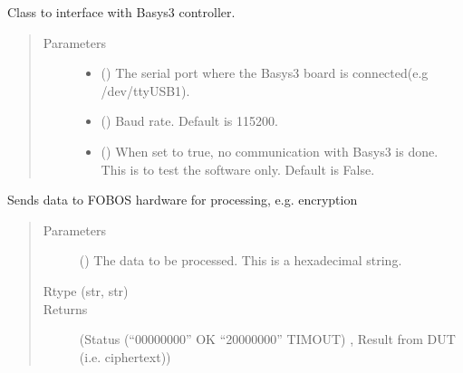 \documentclass[letterpaper,10pt,english]{sphinxmanual}
\begin{document}
\begin{fulllineitems}
\label{\detokenize{reference_doc:fobos.Basys3Ctrl}}
Class to interface with Basys3 controller.
\begin{quote}\begin{description}
\item[{Parameters}] \leavevmode\begin{itemize}
\item {} 
 () \textendash{} The serial port where the Basys3 board is connected(e.g /dev/ttyUSB1).

\item {} 
 () \textendash{} Baud rate. Default is 115200.

\item {} 
 () \textendash{} When set to true, no communication with Basys3 is done.
This is to test the software only. Default is False.

\end{itemize}

\end{description}\end{quote}

\begin{fulllineitems}
\label{\detokenize{reference_doc:fobos.Basys3Ctrl.processData}}
Sends data to FOBOS hardware for processing, e.g. encryption
\begin{quote}\begin{description}
\item[{Parameters}] \leavevmode
{} () \textendash{} The data to be processed. This is a hexadecimal string.

\item[{Rtype (str, str)}] \leavevmode
\item[{Returns}] \leavevmode
(Status (“00000000” OK \textbar{} “20000000” TIMOUT) , Result from DUT (i.e. ciphertext))


\end{description}
\end{quote}
\end{fulllineitems}
\end{fulllineitems}
\end{document}
